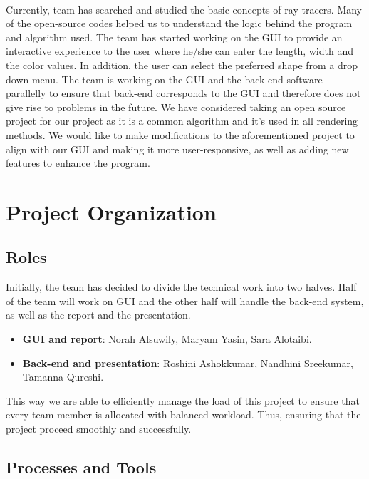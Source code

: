 \documentclass{article}
\begin{document}
\paragraph{}
Currently, team has searched and studied the basic concepts of ray tracers. Many of the open-source codes helped us to understand the logic behind the program and algorithm used. The team has started working on the GUI to provide an interactive experience to the user where he/she can enter the length, width and the color values. In addition, the user can select the preferred shape from a drop down menu. 
\newline 
The team is working on the GUI and the back-end software parallelly to ensure that back-end corresponds to the GUI and therefore does not give rise to problems in the future. We have considered taking an open source project for our project as it is a common algorithm and it's used in all rendering methods. We would like to make modifications to the aforementioned project to align with our GUI and making it more user-responsive, as well as adding new features to enhance the program. 




\section{Project Organization}

\subsection{Roles}
Initially, the team has decided to divide the technical work into two halves. Half of the team will work on GUI and the other half will handle the back-end system, as well as the report and the presentation.  
\begin{itemize}

\item \textbf{GUI and report}: Norah Alsuwily, Maryam Yasin, Sara Alotaibi. 
\item \textbf{Back-end and presentation}: Roshini Ashokkumar, Nandhini Sreekumar, Tamanna Qureshi. 

\end{itemize}

This way we are able to efficiently manage the load of this project to ensure that every team member is allocated with balanced workload. Thus, ensuring that the project proceed smoothly and successfully. 


\subsection{Processes and Tools}
\end{document}
